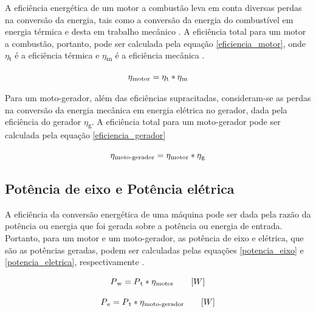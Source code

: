A eficiência energética de um motor a combustão leva em conta diversas perdas na conversão da energia, tais como a conversão da energia do combustível em energia térmica e desta em trabalho mecânico . A eficiência total para um motor a combustão, portanto, pode ser calculada pela equação \ref{eficiencia_motor}, onde $\eta$\textsubscript{t} é a eficiência térmica e $\eta$\textsubscript{m} é a eficiência mecânica \cite{brunetti2012}.

\begin{equation} \label{eficiencia_motor}
\eta\textsubscript{motor} = \eta\textsubscript{t} * \eta\textsubscript{m} 
\end{equation}

Para um moto-gerador, além das eficiências supracitadas, consideram-se as perdas na conversão da energia mecânica em energia elétrica no gerador, dada pela eficiência do gerador $\eta$\textsubscript{g}. A eficiência total para um moto-gerador pode ser calculada pela equação \ref{eficiencia_gerador}

\begin{equation} \label{eficiencia_gerador}
\eta\textsubscript{moto-gerador} = \eta\textsubscript{motor} * \eta\textsubscript{g}
\end{equation}


\subsection{Potência de eixo e Potência elétrica}

A eficiência da conversão energética de uma máquina pode ser dada pela razão da potência ou energia que foi gerada sobre a potência ou energia de entrada. Portanto, para um motor e um moto-gerador, as potência de eixo e elétrica, que são as potências geradas, podem ser calculadas pelas equações \ref{potencia_eixo} e \ref{potencia_eletrica}, respectivamente \cite{brunetti2012}.

\begin{equation} \label{potencia_eixo}
P\textsubscript{w} = P\textsubscript{t} * \eta\textsubscript{motor} \qquad [W]
\end{equation}

\begin{equation} \label{potencia_eletrica}
P\textsubscript{e} = P\textsubscript{t} * \eta\textsubscript{moto-gerador} \qquad [W]
\end{equation}


